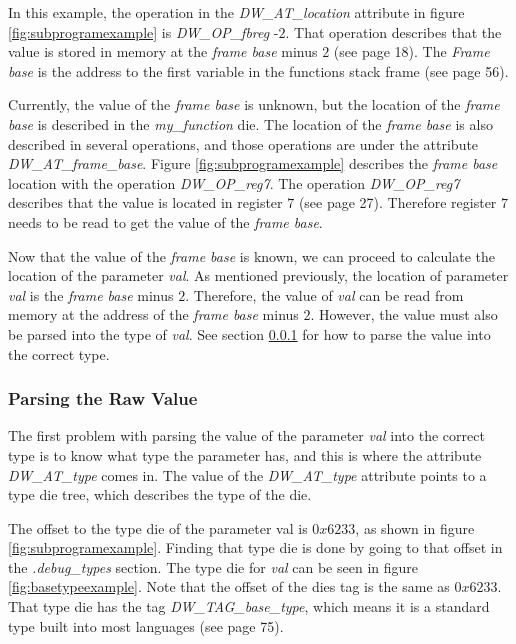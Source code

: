 In this example, the operation in the \emph{DW\_AT\_location} attribute in figure \ref{fig:subprogramexample} is \emph{DW\_OP\_fbreg} -$2$.
That operation describes that the value is stored in memory at the \emph{frame base} minus $2$ (see \cite{dwarf} page 18).
The \emph{Frame base} is the address to the first variable in the functions stack frame (see \cite{dwarf} page 56).


Currently, the value of the \emph{frame base} is unknown, but the location of the \emph{frame base} is described in the \emph{my\_function} \gls{die}.
The location of the \emph{frame base} is also described in several operations, and those operations are under the attribute \emph{DW\_AT\_frame\_base}.
Figure \ref{fig:subprogramexample} describes the \emph{frame base} location with the operation \emph{DW\_OP\_reg7}.
The operation \emph{DW\_OP\_reg7} describes that the value is located in register $7$ (see \cite{dwarf} page 27).
Therefore register $7$ needs to be read to get the value of the \emph{frame base}.


Now that the value of the \emph{frame base} is known, we can proceed to calculate the location of the parameter \emph{val}.
As mentioned previously, the location of parameter \emph{val} is the \emph{frame base} minus $2$.
Therefore, the value of \emph{val} can be read from memory at the address of the \emph{frame base} minus $2$.
However, the value must also be parsed into the type of \emph{val}.
See section \ref{sec:parsingvalue} for how to parse the value into the correct type.


\subsubsection{Parsing the Raw Value} \label{sec:parsingvalue}
The first problem with parsing the value of the parameter \emph{val} into the correct type is to know what type the parameter has, and this is where the attribute \emph{DW\_AT\_type} comes in.
The value of the \emph{DW\_AT\_type} attribute points to a type \gls{die} tree, which describes the type of the \gls{die}.


The offset to the type \gls{die} of the parameter val is $0x6233$, as shown in figure \ref{fig:subprogramexample}.
Finding that type \gls{die} is done by going to that offset in the \emph{.debug\_types} section.
  The type \gls{die} for \emph{val} can be seen in figure \ref{fig:basetypeexample}.
  Note that the offset of the \glspl{die} tag is the same as $0x6233$.
  That type \gls{die} has the tag \emph{DW\_TAG\_base\_type}, which means it is a standard type built into most languages (see \cite{dwarf} page 75).


